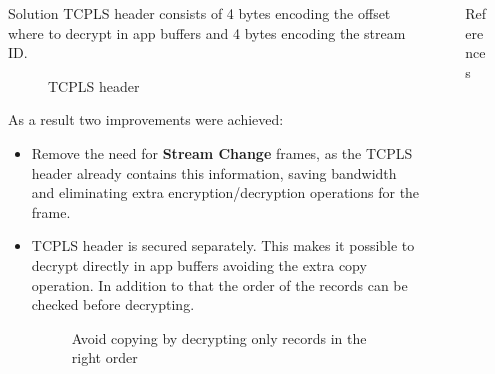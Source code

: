 \documentclass[final]{beamer}
\newlength{\sepwidth}
\newlength{\colwidth}
\newcommand{\separatorcolumn}{\begin{column}{\sepwidth}\end{column}}
\begin{document}
\begin{frame}[t]
\begin{columns}[t]
      \begin{column}{\colwidth}
        \begin{block}{Solution}
          TCPLS header consists of 4 bytes encoding the offset where to decrypt in app buffers and 4 bytes encoding the
          stream ID.
          \begin{figure}
            \centering
            
            \caption{TCPLS header}
            \label{fig:header}
          \end{figure}
          As a result two improvements were achieved:
          \begin{itemize}
            \item Remove the need for \textbf{Stream Change} frames,
            as the TCPLS header already contains this information,
            saving bandwidth and eliminating extra encryption/decryption operations for the frame.
            \item TCPLS header is secured separately.
            This makes it possible to decrypt directly in app buffers avoiding the extra copy operation.
            In addition to that the order of the records can be checked before decrypting.
            \begin{figure}
              \centering
              
              \caption{Avoid copying by decrypting only records in the right order}
              \label{fig:dec_hdr}
            \end{figure}
          \end{itemize}
        \end{block}
      \end{column}
      \separatorcolumn

      \begin{column}{\colwidth}

        \begin{block}{References}

          \nocite{*}
          \footnotesize{}

        \end{block}

        \begin{figure}
          \centering
          
          \label{fig:unamur}
        \end{figure}
        \begin{figure}
          \centering
          
          \label{fig:cyberwal}
        \end{figure}

      \end{column}

      \separatorcolumn
    \end{columns}
  \end{frame}
\end{document}
